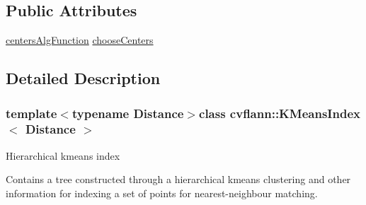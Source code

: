 \subsection*{Public Attributes}
\begin{DoxyCompactItemize}
\item 
\hyperlink{classcvflann_1_1KMeansIndex_a09b9ff9e5a1686adc4a5e6cc8a765768}{centers\-Alg\-Function} \hyperlink{classcvflann_1_1KMeansIndex_af02aa808b786b448cc5aaac95104d0d7}{choose\-Centers}
\end{DoxyCompactItemize}


\subsection{Detailed Description}
\subsubsection*{template$<$typename Distance$>$class cvflann\-::\-K\-Means\-Index$<$ Distance $>$}

Hierarchical kmeans index

Contains a tree constructed through a hierarchical kmeans clustering and other information for indexing a set of points for nearest-\/neighbour matching. 

